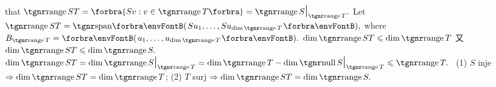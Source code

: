 \NOTICE that \uline{$\range ST=\Bra{Sv:v\in\range T}=\range S\mmid_{\range T}.$}\parSol{}
Let $\range ST=\Span{Su_1,\dots,Su_{\dim\range T}},$ where \,$B_{\range T}=\Par{u_1,\dots,u_{\dim\range T}}.$\parSol{}
$\dim\range ST\leqslant \dim\range T$
又 $\dim\range ST\leqslant \dim\range S.$\PfEnd\parSol{\vspace{4pt}}
\Or $\dim\range ST=\dim\range S\mmid_{\range T}=\dim\range T-\dim\null S\mmid_{\range T}\leqslant \range T.$\PfEnd\vspace{4pt}
\Corollary \,\,\,(1) $S$ inje $\Rightarrow\dim\range ST=\dim\range T$; \; (2) $T$ surj $\Rightarrow\dim\range ST=\dim\range S.$
\SepLine

